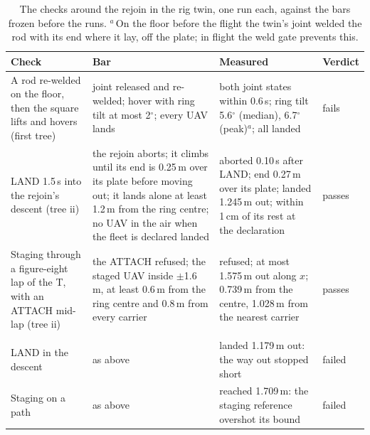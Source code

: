 \begin{table}[htbp]
\centering
\footnotesize
\caption[Around the rejoin]{The checks around the rejoin in the rig twin, one run each, against the bars frozen
before the runs. $^a$\,On the floor before the flight the twin's joint welded the rod with its end where it lay, off
the plate; in flight the weld gate prevents this.}
\label{tab:rejoin_neighbours}
\begin{tabularx}{\textwidth}{>{\raggedright\arraybackslash}p{3.4cm}>{\raggedright\arraybackslash}X>{\raggedright\arraybackslash}X>{\raggedright\arraybackslash}p{1.3cm}}
\toprule
Check & Bar & Measured & Verdict \\
\midrule
A rod re-welded on the floor, then the square lifts and hovers (first tree)
  & joint released and re-welded; hover with ring tilt at most 2$^\circ$; every UAV lands
  & both joint states within 0.6\,s; ring tilt 5.6$^\circ$ (median), 6.7$^\circ$ (peak)$^a$; all landed & fails \\
LAND 1.5\,s into the rejoin's descent (tree ii)
  & the rejoin aborts; it climbs until its end is 0.25\,m over its plate before moving out; it lands alone at least
  1.2\,m from the ring centre; no UAV in the air when the fleet is declared landed
  & aborted 0.10\,s after LAND; end 0.27\,m over its plate; landed 1.245\,m out; within 1\,cm of its rest at the
  declaration & passes \\
Staging through a figure-eight lap of the T, with an ATTACH mid-lap (tree ii)
  & the ATTACH refused; the staged UAV inside $\pm$1.6\,m, at least 0.6\,m from the ring centre and 0.8\,m from every
  carrier
  & refused; at most 1.575\,m out along $x$; 0.739\,m from the centre, 1.028\,m from the nearest carrier & passes \\
\midrule
\multicolumn{4}{l}{\emph{Before the fixes (first tree)}} \\
LAND in the descent & as above & landed 1.179\,m out: the way out stopped short & failed \\
Staging on a path & as above & reached 1.709\,m: the staging reference overshot its bound & failed \\
\bottomrule
\end{tabularx}
\end{table}

